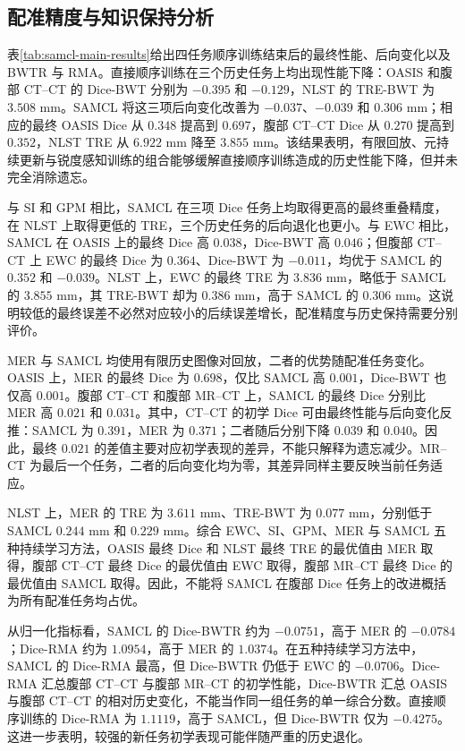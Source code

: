 \subsection{配准精度与知识保持分析}
\label{subsubsec:samcl-analysis}

表\ref{tab:samcl-main-results}给出四任务顺序训练结束后的最终性能、后向变化以及 BWTR 与 RMA。直接顺序训练在三个历史任务上均出现性能下降：OASIS 和腹部 CT--CT 的 Dice-BWT 分别为 $-0.395$ 和 $-0.129$，NLST 的 TRE-BWT 为 $3.508$ mm。SAMCL 将这三项后向变化改善为 $-0.037$、$-0.039$ 和 $0.306$ mm；相应的最终 OASIS Dice 从 $0.348$ 提高到 $0.697$，腹部 CT--CT Dice 从 $0.270$ 提高到 $0.352$，NLST TRE 从 $6.922$ mm 降至 $3.855$ mm。该结果表明，有限回放、元持续更新与锐度感知训练的组合能够缓解直接顺序训练造成的历史性能下降，但并未完全消除遗忘。



与 SI 和 GPM 相比，SAMCL 在三项 Dice 任务上均取得更高的最终重叠精度，在 NLST 上取得更低的 TRE，三个历史任务的后向退化也更小。与 EWC 相比，SAMCL 在 OASIS 上的最终 Dice 高 $0.038$，Dice-BWT 高 $0.046$；但腹部 CT--CT 上 EWC 的最终 Dice 为 $0.364$、Dice-BWT 为 $-0.011$，均优于 SAMCL 的 $0.352$ 和 $-0.039$。NLST 上，EWC 的最终 TRE 为 $3.836$ mm，略低于 SAMCL 的 $3.855$ mm，其 TRE-BWT 却为 $0.386$ mm，高于 SAMCL 的 $0.306$ mm。这说明较低的最终误差不必然对应较小的后续误差增长，配准精度与历史保持需要分别评价。

MER 与 SAMCL 均使用有限历史图像对回放，二者的优势随配准任务变化。OASIS 上，MER 的最终 Dice 为 $0.698$，仅比 SAMCL 高 $0.001$，Dice-BWT 也仅高 $0.001$。腹部 CT--CT 和腹部 MR--CT 上，SAMCL 的最终 Dice 分别比 MER 高 $0.021$ 和 $0.031$。其中，CT--CT 的初学 Dice 可由最终性能与后向变化反推：SAMCL 为 $0.391$，MER 为 $0.371$；二者随后分别下降 $0.039$ 和 $0.040$。因此，最终 $0.021$ 的差值主要对应初学表现的差异，不能只解释为遗忘减少。MR--CT 为最后一个任务，二者的后向变化均为零，其差异同样主要反映当前任务适应。

NLST 上，MER 的 TRE 为 $3.611$ mm、TRE-BWT 为 $0.077$ mm，分别低于 SAMCL $0.244$ mm 和 $0.229$ mm。综合 EWC、SI、GPM、MER 与 SAMCL 五种持续学习方法，OASIS 最终 Dice 和 NLST 最终 TRE 的最优值由 MER 取得，腹部 CT--CT 最终 Dice 的最优值由 EWC 取得，腹部 MR--CT 最终 Dice 的最优值由 SAMCL 取得。因此，不能将 SAMCL 在腹部 Dice 任务上的改进概括为所有配准任务均占优。

从归一化指标看，SAMCL 的 Dice-BWTR 约为 $-0.0751$，高于 MER 的 $-0.0784$；Dice-RMA 约为 $1.0954$，高于 MER 的 $1.0374$。在五种持续学习方法中，SAMCL 的 Dice-RMA 最高，但 Dice-BWTR 仍低于 EWC 的 $-0.0706$。Dice-RMA 汇总腹部 CT--CT 与腹部 MR--CT 的初学性能，Dice-BWTR 汇总 OASIS 与腹部 CT--CT 的相对历史变化，不能当作同一组任务的单一综合分数。直接顺序训练的 Dice-RMA 为 $1.1119$，高于 SAMCL，但 Dice-BWTR 仅为 $-0.4275$。这进一步表明，较强的新任务初学表现可能伴随严重的历史退化。

